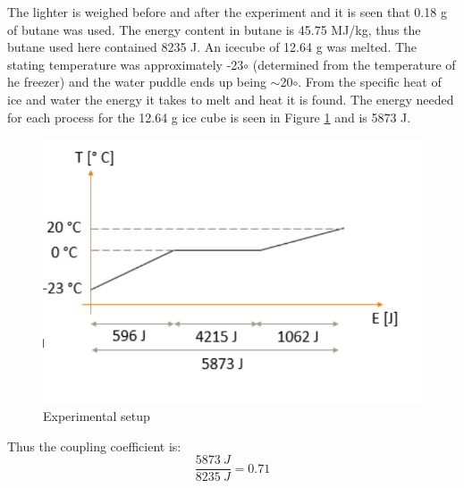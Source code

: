 \noindent
The lighter is weighed before and after the experiment and it is seen that 0.18 g of butane was used. The energy content in butane is 45.75 MJ/kg, thus the butane used here contained 8235 J. An icecube of 12.64 g was melted. The stating temperature was approximately -23$\circ$ (determined from the temperature of he freezer) and the water puddle ends up being $\sim$20$\circ$. From the specific heat of ice and water the energy it takes to melt and heat it is found. The energy needed for each process for the 12.64 g ice cube is seen in Figure \ref{fig:lucascouplinggraf} and is 5873 J.
\begin{figure}[htb]
\begin{center}
\includegraphics[scale=0.8]{figures/navtheory/couplinggraf}
\caption{Experimental setup}
\label{fig:lucascouplinggraf}
\end{center}
\end{figure}
Thus the coupling coefficient is:
\begin{equation}
\dfrac{5873\ J}{8235 \ J}= 0.71
\end{equation}
